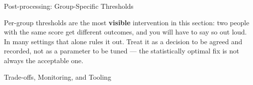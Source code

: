\begin{frame}{Post-processing: Group-Specific Thresholds}
    \vspace{0.6em}
    \begin{tcolorbox}[colback=raiAmber!5, colframe=raiAmber!70, title=Before you reach for this]
        \scriptsize Per-group thresholds are the most \textbf{visible} intervention in this section:
        two people with the same score get different outcomes, and you will have to say so out loud.
        In many settings that alone rules it out. Treat it as a decision to be agreed and recorded,
        not as a parameter to be tuned --- the statistically optimal fix is not always the
        acceptable one.
    \end{tcolorbox}
\end{frame}

\begin{frame}{Trade-offs, Monitoring, and Tooling}


\end{frame}
